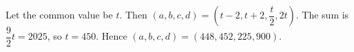 Let the common value be $t$. Then $(a,b,c,d)=(t-2,t+2,\dfrac{t}{2},2t)$. The sum is $\dfrac{9}{2}t=2025$, so $t=450$. Hence $\boxed{(a,b,c,d)=(448,452,225,900)}$.
